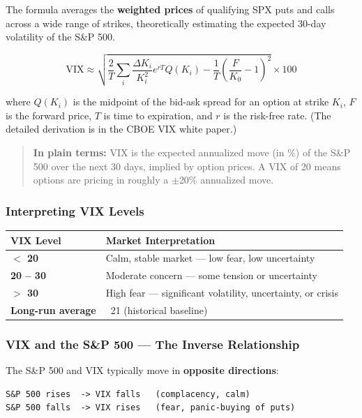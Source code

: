 \documentclass[12pt,openany]{book}
\begin{document}
The formula averages the \textbf{weighted prices} of qualifying SPX puts and calls across a wide range of strikes, theoretically estimating the expected 30-day volatility of the S\&P 500.

\[
\text{VIX} \approx \sqrt{\frac{2}{T} \sum_i \frac{\Delta K_i}{K_i^2} e^{rT} Q(K_i) - \frac{1}{T}\left(\frac{F}{K_0} - 1\right)^2} \times 100
\]

where \(Q(K_i)\) is the midpoint of the bid-ask spread for an option at strike \(K_i\), \(F\) is the forward price, \(T\) is time to expiration, and \(r\) is the risk-free rate. (The detailed derivation is in the CBOE VIX white paper.)

\begin{quote}
\textbf{In plain terms:} VIX is the expected annualized move (in \%) of the S\&P 500 over the next 30 days, implied by option prices. A VIX of 20 means options are pricing in roughly a \(\pm\)20\% annualized move.
\end{quote}

\subsubsection{Interpreting VIX Levels}

\begin{center}
\scriptsize
\setlength{\tabcolsep}{3pt}
\begin{tabular}{|L{6.3cm}|L{6.3cm}|}
\hline
\textbf{VIX Level} & \textbf{Market Interpretation} \\
\hline
\textbf{\(<\) 20} & Calm, stable market — low fear, low uncertainty \\
\hline
\textbf{20 – 30} & Moderate concern — some tension or uncertainty \\
\hline
\textbf{\(>\) 30} & High fear — significant volatility, uncertainty, or crisis \\
\hline
\textbf{Long-run average} & ~21 (historical baseline) \\
\hline
\end{tabular}
\end{center}

\subsubsection{VIX and the S\&P 500 — The Inverse Relationship}

The S\&P 500 and VIX typically move in \textbf{opposite directions}:

\begin{center}
\begin{Verbatim}[fontsize=\small,breaklines=true]
S&P 500 rises  -> VIX falls   (complacency, calm)
S&P 500 falls  -> VIX rises   (fear, panic-buying of puts)
\end{Verbatim}
\end{center}
\end{document}
